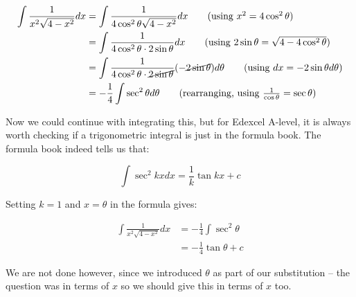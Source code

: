 \begin{solution}
    \begin{align*}
        \int \frac{1}{x^2\sqrt{4 - x^2}}dx &= \int \frac{1}{4\cos^2 \theta\sqrt{4 - x^2}}dx \tag{using $x^2 = 4\cos^2 \theta$}\\
         &= \int \frac{1}{4\cos^2 \theta \cdot 2 \sin \theta}dx \tag{using $2 \sin \theta = \sqrt{4 - 4\cos^2 \theta}$}\\
         &= \int \frac{1}{4\cos^2 \theta \cdot \cancel{2 \sin \theta}}(-\cancel{2\sin \theta})  d\theta  \tag{using $dx = -2\sin \theta  d\theta$}\\
         &= -\frac{1}{4}\int \sec^2 \theta d\theta \tag{rearranging, using $\frac{1}{\cos \theta} = \sec \theta$}
    \end{align*}

    Now we could continue with integrating this, but for Edexcel A-level, it is always worth checking if a trigonometric integral is just in the formula book. The formula book indeed tells us that:

    \[ \int \sec^2 kx dx  = \frac{1}{k}\tan kx + c\]

    Setting $k=1$ and $x = \theta$ in the formula gives:

    \begin{align*}
        \int \frac{1}{x^2\sqrt{4 - x^2}}dx &=  -\frac{1}{4}\int \sec^2 \theta \tag{where we left off}\\
        &= -\frac{1}{4}\tan \theta + c
    \end{align*}

    We are not done however, since we introduced $\theta$ as part of our substitution -- the question was in terms of $x$ so we should give this in terms of $x$ too.


\end{solution}
